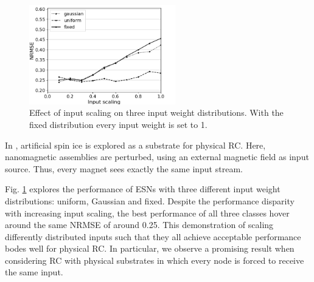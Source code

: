 \begin{figure}[H]
  \centering
  \includegraphics[width=2.5in]{img/input_scaling_distrib.png}
  \caption{
    Effect of input scaling on three input weight distributions. With the fixed
distribution every input weight is set to 1.
  }
  \label{input_scaling_distrib}
\end{figure}

In \cite{jensen_computation_2018}, artificial spin ice is explored as a
substrate for physical RC. Here, nanomagnetic assemblies are perturbed, using an
external magnetic field as input source. Thus, every magnet sees exactly the
same input stream.

Fig. \ref{input_scaling_distrib} explores the performance of ESNs with three
different input weight distributions: uniform, Gaussian and fixed. Despite the
performance disparity with increasing input scaling, the best performance of all
three classes hover around the same NRMSE of around 0.25. This demonstration of
scaling differently distributed inputs such that they all achieve acceptable
performance bodes well for physical RC. In particular, we observe a promising
result when considering RC with physical substrates in which every node is
forced to receive the same input.

